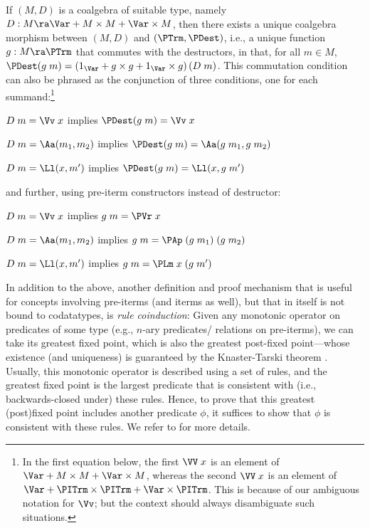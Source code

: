 \begin{prop} \label{prop-corec-piterm} \rm
If $(M,D)$ is a coalgebra of suitable type, namely 
$D :  M \ra \Var + M \times M + \Var\times M$, then there exists a unique coalgebra morphism between $(M,D)$ and $(\PTrm,\PDest)$, i.e., a unique function $g:M\ra \PTrm$ that commutes with the destructors, in that, for all $m\in M$, 
$\PDest(g\;m) = (1_\Var + g \times g + 1_\Var \times g)\,(D\;m)$. This commutation condition can also be phrased as the conjunction of three conditions, one for each summand:\footnote{In the first equation below, the first $\VV\;x$ is an element of $\Var + M \times M + \Var\times M$, whereas the second $\VV\;x$ is an element of $\Var + \PITrm \times \PITrm  + \Var\times \PITrm $. This is because of our ambiguous notation for $\Vv$; but the context should always disambiguate such situations.}
%
\begin{myitem} 
	\item $D\;m = \Vv\;x$ implies $\PDest(g\;m) = \Vv\;x$
	\item $D\;m = \Aa (m_1,m_2)$ implies $\PDest(g\;m) = \Aa(g\;m_1,g\;m_2)$
	\item $D\;m = \Ll (x,m')$ implies $\PDest(g\;m) = \Ll (x,g\;m')$
\end{myitem} 
%
and further, using pre-iterm constructors instead of destructor:
\begin{myitem} 
	\item $D\;m = \Vv\;x$ implies $g\;m = \PVr\;x$
	\item $D\;m = \Aa (m_1,m_2)$ implies $g\;m = \PAp\;(g\;m_1)\;(g\;m_2)$
	\item $D\;m = \Ll (x,m')$ implies $g\;m = \PLm\;x\;(g\;m')$
\end{myitem} 
\end{prop} 

In addition to the above, another definition and proof mechanism that is useful for concepts involving pre-iterms (and iterms as well), but that in itself is not bound to codatatypes, is \emph{rule coinduction}: Given any monotonic operator on predicates of some type (e.g., $n$-ary predicates/ relations on pre-iterms), we can take its greatest fixed point, which is also the greatest post-fixed point---whose existence (and uniqueness) is guaranteed by the Knaster-Tarski theorem \cite{knasterTarski}. Usually, this monotonic operator is described using a set of rules, and the greatest fixed point is the largest predicate that is consistent with (i.e., backwards-closed under) these rules. Hence, to prove that this greatest (post)fixed point includes another predicate $\phi$, it suffices to show that $\phi$ is consistent with these rules. 
We refer to \cite[\S21.1]{DBLP:books/daglib/0005958} for more details. 

